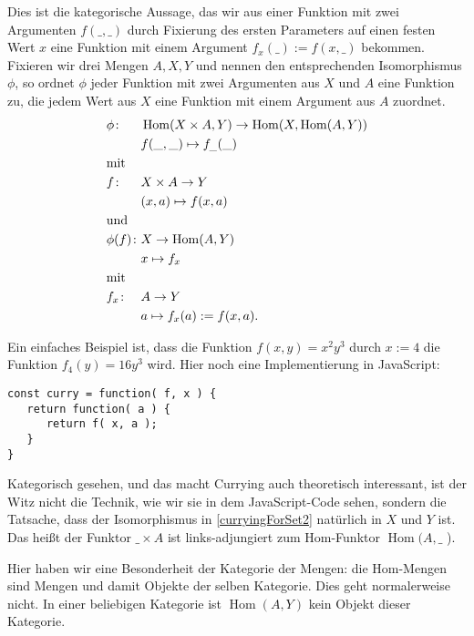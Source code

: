 \documentclass[a4paper]{amsart}
\theoremstyle{definition}
\DeclareMathOperator{\Hom}{Hom}
\begin{document}
Dies ist die kategorische Aussage, das wir aus einer Funktion mit zwei Argumenten $f(\_, \_)$ durch Fixierung des ersten Parameters auf einen festen Wert $x$ eine Funktion mit einem Argument $f_x( \_ ) := f(x, \_)$ bekommen. Fixieren wir drei Mengen $A, X, Y$ und nennen den entsprechenden Isomorphismus $\phi$, so ordnet $\phi$ jeder Funktion mit zwei Argumenten aus $X$ und $A$ eine Funktion zu, die jedem Wert aus $X$ eine Funktion mit einem Argument aus $A$ zuordnet.
\begin{equation*}
   \begin{alignedat}[b]{2}
   &\phi \colon &&\Hom(X \times A, Y ) \to \Hom(X, \Hom( A, Y))\\
               &&&f( \_, \_ )          \mapsto f_{\_}( \_ )\\
   &\text{mit}\\
   &f \colon &&X \times A \to Y\\
            &&&( x, a )  \mapsto f(x,a )\\
&\text{und}\\
   &\phi(f) \colon &&X \to \Hom( A, Y)\\
   &&&x   \mapsto f_x\\
&\text{mit}\\
   &f_x \colon &&A \to Y\\
   &&&a   \mapsto f_x(a) := f( x, a ).
\end{alignedat}
\end{equation*}

Ein einfaches Beispiel ist, dass die Funktion $f(x, y) = x^2y^3$ durch $x:=4$ die Funktion $f_4(y) = 16y^3$ wird. Hier noch eine Implementierung in JavaScript:
\begin{verbatim}
const curry = function( f, x ) {
   return function( a ) {
      return f( x, a );
   }
}
\end{verbatim}

Kategorisch gesehen, und das macht Currying auch theoretisch interessant, ist der Witz nicht die Technik, wie wir sie in dem JavaScript-Code sehen, sondern die Tatsache, dass der Isomorphismus in \eqref{curryingForSet2} natürlich in $X$ und $Y$ ist. Das heißt der Funktor $\_ \times A$ ist links-adjungiert zum Hom-Funktor $\Hom( A, \_$ ).

Hier haben wir eine Besonderheit der Kategorie der Mengen: die Hom-Mengen sind Mengen und damit Objekte der selben Kategorie. Dies geht normalerweise nicht. In einer beliebigen Kategorie ist $\Hom( A, Y)$ kein Objekt dieser Kategorie.

\end{document}
